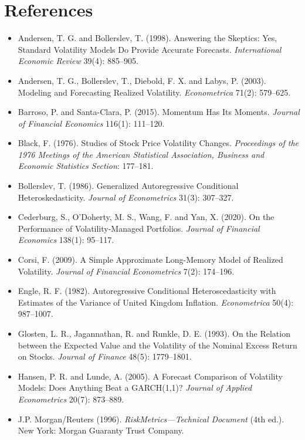 \section*{References}

\begin{itemize}
  \item Andersen, T. G. and Bollerslev, T. (1998). Answering the Skeptics: Yes, Standard Volatility Models Do Provide Accurate Forecasts. \emph{International Economic Review} 39(4): 885--905.
  \item Andersen, T. G., Bollerslev, T., Diebold, F. X. and Labys, P. (2003). Modeling and Forecasting Realized Volatility. \emph{Econometrica} 71(2): 579--625.
  \item Barroso, P. and Santa-Clara, P. (2015). Momentum Has Its Moments. \emph{Journal of Financial Economics} 116(1): 111--120.
  \item Black, F. (1976). Studies of Stock Price Volatility Changes. \emph{Proceedings of the 1976 Meetings of the American Statistical Association, Business and Economic Statistics Section}: 177--181.
  \item Bollerslev, T. (1986). Generalized Autoregressive Conditional Heteroskedasticity. \emph{Journal of Econometrics} 31(3): 307--327.
  \item Cederburg, S., O'Doherty, M. S., Wang, F. and Yan, X. (2020). On the Performance of Volatility-Managed Portfolios. \emph{Journal of Financial Economics} 138(1): 95--117.
  \item Corsi, F. (2009). A Simple Approximate Long-Memory Model of Realized Volatility. \emph{Journal of Financial Econometrics} 7(2): 174--196.
  \item Engle, R. F. (1982). Autoregressive Conditional Heteroscedasticity with Estimates of the Variance of United Kingdom Inflation. \emph{Econometrica} 50(4): 987--1007.
  \item Glosten, L. R., Jagannathan, R. and Runkle, D. E. (1993). On the Relation between the Expected Value and the Volatility of the Nominal Excess Return on Stocks. \emph{Journal of Finance} 48(5): 1779--1801.
  \item Hansen, P. R. and Lunde, A. (2005). A Forecast Comparison of Volatility Models: Does Anything Beat a GARCH(1,1)? \emph{Journal of Applied Econometrics} 20(7): 873--889.
  \item J.P. Morgan/Reuters (1996). \emph{RiskMetrics---Technical Document} (4th ed.). New York: Morgan Guaranty Trust Company.

\end{itemize}
